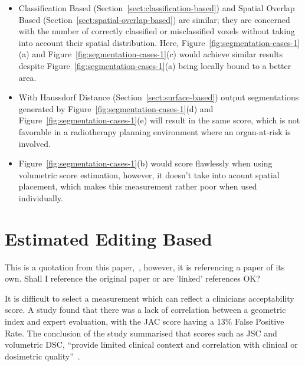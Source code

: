 \documentclass[12pt,twoside]{report}
\begin{document}
\begin{itemize}
  \item Classification Based (Section~\ref{sect:classification-based}) and Spatial Overlap Based (Section~\ref{sect:spatial-overlap-based}) are similar; they are concerned with the number of correctly classified or misclassified voxels without taking into account their spatial distribution. Here, Figure~\ref{fig:segmentation-cases-1}(a) and Figure~\ref{fig:segmentation-cases-1}(c) would achieve similar results despite Figure~\ref{fig:segmentation-cases-1}(a) being locally bound to a better area.
  \item With Haussdorf Distance (Section~\ref{sect:surface-based}) output segmentations generated by Figure~\ref{fig:segmentation-cases-1}(d) and Figure~\ref{fig:segmentation-cases-1}(e) will result in the same score, which is not favorable in a radiotherapy planning environment where an organ-at-risk is involved.
  \item Figure~\ref{fig:segmentation-cases-1}(b) would score flawlessly when using volumetric score estimation, however, it doesn't take into acount spatial placement, which makes this measurement rather poor when used individually.
\end{itemize}

\section{Estimated Editing Based}\label{sect:surface-dice}

\begin{warning}
  This is a quotation from this paper,~\cite{Sherer2021-le}, however, it is referencing a paper of its own. Shall I reference the original paper or are 'linked' references OK?
\end{warning}

It is difficult to select a measurement which can reflect a clinicians acceptability score. A study found that there was a lack of correlation between a geometric index and expert evaluation, with the JAC score having a 13\% False Positive Rate. The conclusion of the study summarised that scores such as JSC and volumetric DSC, ``provide limited clinical context and correlation with clinical or dosimetric quality''~\cite{Sherer2021-le}.

\end{document}
